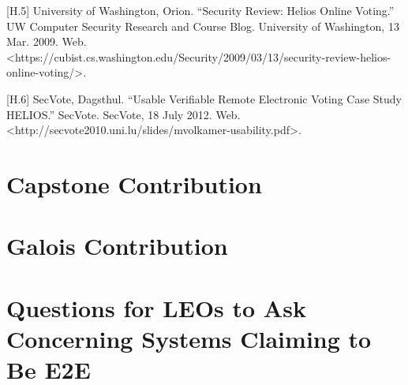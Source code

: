 [H.5] University of Washington, Orion. ``Security Review: Helios Online Voting.'' UW Computer Security Research and Course Blog. University of Washington, 13 Mar. 2009. Web. {\textless}https://cubist.cs.washington.edu/Security/2009/03/13/security-review-helios-online-voting/{\textgreater}.

[H.6] SecVote, Dagsthul. ``Usable Verifiable Remote Electronic Voting Case Study HELIOS.'' SecVote. SecVote, 18 July 2012. Web. {\textless}http://secvote2010.uni.lu/slides/mvolkamer-usability.pdf{\textgreater}.

\section{Capstone Contribution}


\section{Galois Contribution}

\section{Questions for LEOs to Ask Concerning Systems Claiming to Be E2E}

